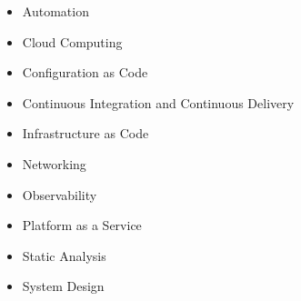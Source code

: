 \begin{itemize}
  \item Automation
  \item Cloud Computing
  \item Configuration as Code
  \item Continuous Integration and Continuous Delivery
  \item Infrastructure as Code
  \item Networking
  \item Observability
  \item Platform as a Service
  \item Static Analysis
  \item System Design
\end{itemize}
